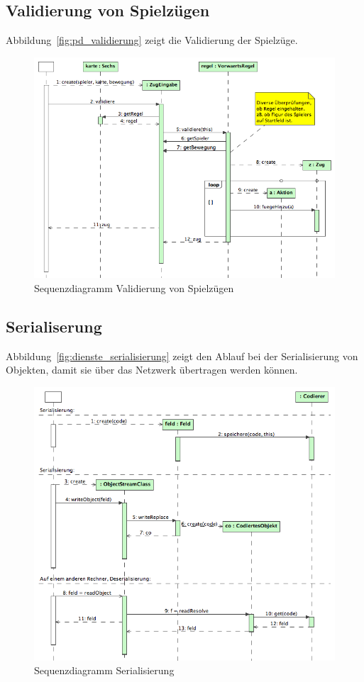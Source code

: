 \documentclass[12pt,halfparskip]{scrartcl}
\begin{document}
\subsection{Validierung von Spielzügen}
\label{ssub:validierung_von_spielzügen}
Abbildung~\vref{fig:pd_validierung} zeigt die Validierung der Spielzüge.
\begin{figure}[h]
	\centering
	\includegraphics[width=\textwidth]{pd_validierung}
	\caption{Sequenzdiagramm Validierung von Spielzügen}
	\label{fig:pd_validierung}
\end{figure}

\clearpage
\subsection{Serialiserung}
\label{sub:serialiserung}
Abbildung~\vref{fig:dienste_serialisierung} zeigt den Ablauf bei der Serialisierung von Objekten, damit sie über das Netzwerk übertragen werden können.
\begin{figure}[h]
	\centering
	\includegraphics[width=\textwidth]{dienste_serialisierung}
	\caption{Sequenzdiagramm Serialisierung}
	\label{fig:dienste_serialisierung}
\end{figure}
\end{document}
